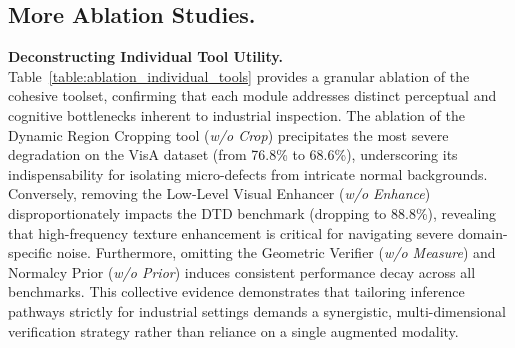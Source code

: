 \documentclass{llmxive}
\begin{document}
{\subsection{More Ablation Studies.}

\begin{table}[t]
\vspace{-1.5em} %
\centering
{}
\vspace{-1.0em} %

\caption{Ablation of individual tools.}
\label{table:ablation_individual_tools}
\end{table}

\textbf{Deconstructing Individual Tool Utility.} Table~\ref{table:ablation_individual_tools} provides a granular ablation of the cohesive toolset, confirming that each module addresses distinct perceptual and cognitive bottlenecks inherent to industrial inspection. The ablation of the Dynamic Region Cropping tool (\emph{w/o Crop}) precipitates the most severe degradation on the VisA dataset (from 76.8\% to 68.6\%), underscoring its indispensability for isolating micro-defects from intricate normal backgrounds. Conversely, removing the Low-Level Visual Enhancer (\emph{w/o Enhance}) disproportionately impacts the DTD benchmark (dropping to 88.8\%), revealing that high-frequency texture enhancement is critical for navigating severe domain-specific noise. Furthermore, omitting the Geometric Verifier (\emph{w/o Measure}) and Normalcy Prior (\emph{w/o Prior}) induces consistent performance decay across all benchmarks. This collective evidence demonstrates that tailoring inference pathways strictly for industrial settings demands a synergistic, multi-dimensional verification strategy rather than reliance on a single augmented modality.

}
\end{document}

